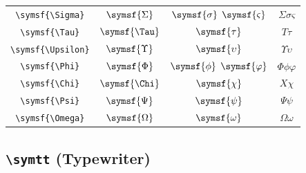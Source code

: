 \documentclass[12pt,a4paper]{article}
\begin{document}
\begin{longtable}{|c|c|c|c|}
\verb|\symsf{\Sigma}| & $\symsf{\Sigma}$ & $\symsf{\sigma}$ $\symsf{\varsigma}$ & $ Σ 𝜎 𝜍 $ \\
\verb|\symsf{\Tau}| & $\symsf{\Tau}$ & $\symsf{\tau}$ & $ Τ 𝜏 $ \\
\verb|\symsf{\Upsilon}| & $\symsf{\Upsilon}$ & $\symsf{\upsilon}$ & $ Υ 𝜐 $ \\
\verb|\symsf{\Phi}| & $\symsf{\Phi}$ & $\symsf{\phi}$ $\symsf{\varphi}$ & $ Φ 𝜙 𝜑 $ \\
\verb|\symsf{\Chi}| & $\symsf{\Chi}$ & $\symsf{\chi}$ & $ Χ 𝜒 $ \\
\verb|\symsf{\Psi}| & $\symsf{\Psi}$ & $\symsf{\psi}$ & $ Ψ 𝜓 $ \\
\verb|\symsf{\Omega}| & $\symsf{\Omega}$ & $\symsf{\omega}$ & $ Ω 𝜔 $ \\
\hline
\end{longtable}

\newpage

\subsection*{\texttt{\textbackslash{}symtt} (Typewriter)}
\end{document}
